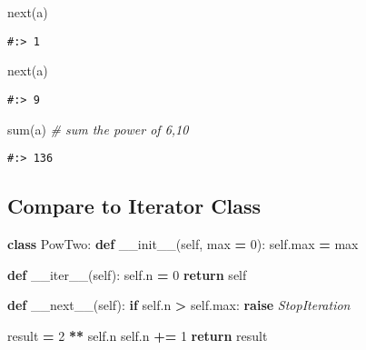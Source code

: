 \documentclass[
]{book}
\newenvironment{Shaded}{\begin{snugshade}}{\end{snugshade}}
\newcommand{\BuiltInTok}[1]{#1}
\newcommand{\CommentTok}[1]{\textcolor[rgb]{0.37,0.37,0.37}{\textit{#1}}}
\newcommand{\ControlFlowTok}[1]{\textcolor[rgb]{0.27,0.27,0.27}{\textbf{#1}}}
\newcommand{\DecValTok}[1]{\textcolor[rgb]{0.06,0.06,0.06}{#1}}
\newcommand{\FunctionTok}[1]{\textcolor[rgb]{0,0,0}{#1}}
\newcommand{\KeywordTok}[1]{\textcolor[rgb]{0.27,0.27,0.27}{\textbf{#1}}}
\newcommand{\NormalTok}[1]{#1}
\newcommand{\OperatorTok}[1]{\textcolor[rgb]{0.43,0.43,0.43}{\textbf{#1}}}
\newcommand{\PreprocessorTok}[1]{\textcolor[rgb]{0.37,0.37,0.37}{\textit{#1}}}
\newcommand{\VariableTok}[1]{\textcolor[rgb]{0,0,0}{#1}}
\begin{document}
\begin{Shaded}
\begin{Highlighting}[]
\BuiltInTok{next}\NormalTok{(a)}
\end{Highlighting}
\end{Shaded}

\begin{verbatim}
#:> 1
\end{verbatim}

\begin{Shaded}
\begin{Highlighting}[]
\BuiltInTok{next}\NormalTok{(a)}
\end{Highlighting}
\end{Shaded}

\begin{verbatim}
#:> 9
\end{verbatim}

\begin{Shaded}
\begin{Highlighting}[]
\BuiltInTok{sum}\NormalTok{(a) }\CommentTok{\# sum the power of 6,10}
\end{Highlighting}
\end{Shaded}

\begin{verbatim}
#:> 136
\end{verbatim}

\hypertarget{compare-to-iterator-class}{%
\subsection{Compare to Iterator Class}\label{compare-to-iterator-class}}

\begin{Shaded}
\begin{Highlighting}[]
\KeywordTok{class}\NormalTok{ PowTwo:}
    \KeywordTok{def} \FunctionTok{\_\_init\_\_}\NormalTok{(}\VariableTok{self}\NormalTok{, }\BuiltInTok{max} \OperatorTok{=} \DecValTok{0}\NormalTok{):}
        \VariableTok{self}\NormalTok{.}\BuiltInTok{max} \OperatorTok{=} \BuiltInTok{max}

    \KeywordTok{def} \FunctionTok{\_\_iter\_\_}\NormalTok{(}\VariableTok{self}\NormalTok{):}
        \VariableTok{self}\NormalTok{.n }\OperatorTok{=} \DecValTok{0}
        \ControlFlowTok{return} \VariableTok{self}

    \KeywordTok{def} \FunctionTok{\_\_next\_\_}\NormalTok{(}\VariableTok{self}\NormalTok{):}
        \ControlFlowTok{if} \VariableTok{self}\NormalTok{.n }\OperatorTok{\textgreater{}} \VariableTok{self}\NormalTok{.}\BuiltInTok{max}\NormalTok{:}
            \ControlFlowTok{raise} \PreprocessorTok{StopIteration}

\NormalTok{        result }\OperatorTok{=} \DecValTok{2} \OperatorTok{**} \VariableTok{self}\NormalTok{.n}
        \VariableTok{self}\NormalTok{.n }\OperatorTok{+=} \DecValTok{1}
        \ControlFlowTok{return}\NormalTok{ result}
\end{Highlighting}
\end{Shaded}
\end{document}

